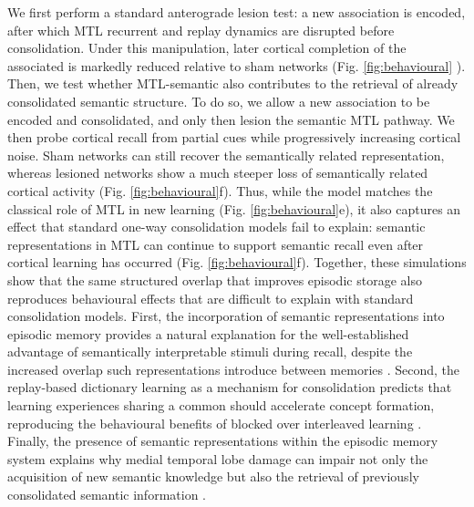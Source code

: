 \documentclass{article}
\providecommand{\DIFaddtex}[1]{{\protect\color{blue}\uwave{#1}}} %
\providecommand{\DIFaddbegin}{} %
\providecommand{\DIFaddend}{} %
\providecommand{\DIFadd}[1]{\texorpdfstring{\DIFaddtex{#1}}{#1}} %
\begin{document}
We first perform a standard anterograde lesion test: a new association is encoded, after which MTL recurrent and replay dynamics are disrupted before consolidation. Under this manipulation, later cortical completion of the associated  \DIFaddbegin \DIFadd{concepts }\DIFaddend is markedly reduced relative to sham networks (Fig. \ref{fig:behavioural} \DIFaddbegin \DIFadd{e}\DIFaddend ). Then, we test whether MTL-semantic also contributes to the retrieval of already consolidated semantic structure. To do so, we allow a new association to be encoded and consolidated, and only then lesion the semantic MTL pathway. We then probe cortical recall from partial cues while progressively increasing cortical noise. Sham networks can still recover the semantically related representation, whereas lesioned networks show a much steeper loss of semantically related cortical activity (Fig. \ref{fig:behavioural}f). Thus, while the model matches the classical role of MTL in new learning (Fig. \ref{fig:behavioural}e), it also captures an effect that standard one-way consolidation models fail to explain: semantic representations in MTL can continue to support semantic recall even after cortical learning has occurred (Fig. \ref{fig:behavioural}f).
\newline\newline
Together, these simulations show that the same structured overlap that improves episodic storage also reproduces behavioural effects that are difficult to explain with standard consolidation models. First, the incorporation of semantic representations into episodic memory provides a natural explanation for the well-established advantage of semantically interpretable stimuli during recall, despite the increased overlap such representations introduce between memories  \DIFaddbegin {}\DIFaddend . Second, the replay-based dictionary learning as a mechanism for consolidation predicts that learning experiences sharing a common  \DIFaddbegin \DIFadd{factor value }\DIFaddend should accelerate concept formation, reproducing the behavioural benefits of blocked over interleaved learning . Finally, the presence of semantic representations within the episodic memory system explains why medial temporal lobe damage can impair not only the acquisition of new semantic knowledge but also the retrieval of previously consolidated semantic information .
\end{document}
